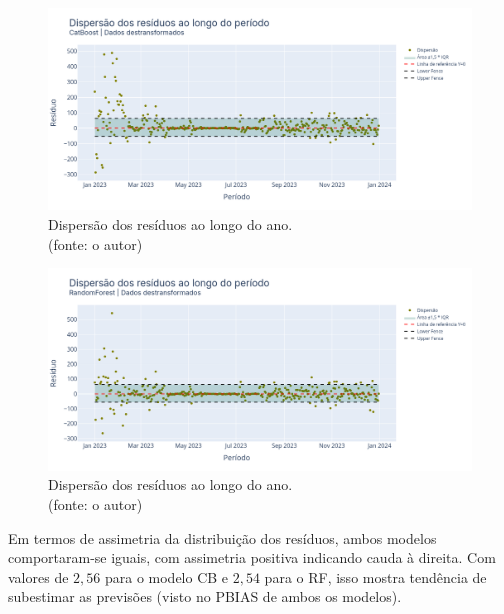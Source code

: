 \begin{figure}[!h]
\centering
\includegraphics[scale=0.33]{Figuras/jequiti/resultados/CB_WFV_LOG_RESID_x_TEMPO.png}
\caption{Dispersão dos resíduos ao longo do ano.\\(fonte: o autor)}
\label{fig:jequiti_CB_WFV_LOG_RESID_x_TEMPO}
\end{figure}

\begin{figure}[!h]
\centering
\includegraphics[scale=0.33]{Figuras/jequiti/resultados/RF_WFV_LOG_RESID_x_TEMPO.png}
\caption{Dispersão dos resíduos ao longo do ano.\\(fonte: o autor)}
\label{fig:jequiti_RF_WFV_LOG_RESID_x_TEMPO}
\end{figure}
\clearpage

Em termos de assimetria da distribuição dos resíduos, ambos modelos comportaram-se iguais, com assimetria positiva indicando cauda à direita. Com valores de $2,56$ para o modelo CB e $2,54$ para o RF, isso mostra tendência de subestimar as previsões (visto no PBIAS de ambos os modelos).


